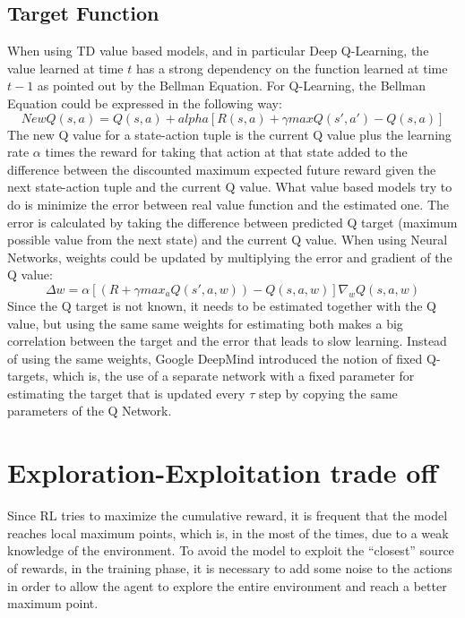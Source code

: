 \documentclass[binding=0.6cm,Lau,oneside]{sapthesis} %
\begin{document}
\subsection{Target Function}
When using TD value based models, and in particular Deep Q-Learning, the value learned at time $t$ has a strong dependency on the function learned at time $t-1$ as pointed out by the Bellman Equation. \newline
For Q-Learning, the Bellman Equation could be expressed in the following way:
\begin{equation}
NewQ( s,a ) = Q( s,a ) + alpha [ R(s,a) + \gamma maxQ(s',a') - Q(s,a) ]
\end{equation}
The new Q value for a state-action tuple is the current Q value plus the learning rate $\alpha$ times the reward for taking that action at that state added to the difference between the discounted  maximum expected future reward given the next state-action tuple and the current Q value. \newline
What value based models try to do is minimize the error between real value function and the estimated one. The error is calculated by taking the difference between predicted Q target (maximum possible value from the next state) and the current Q value. When using Neural Networks, weights could be updated by multiplying the error and gradient of the Q value:
\begin{equation}
\Delta w = \alpha [ (R + \gamma max_a Q(s',a,w)) - Q(s,a,w)] \nabla_w Q( s,a,w )
\end{equation}
Since the Q target is not known, it needs to be estimated together with the Q value, but using the same same weights for estimating both makes a big correlation between the target and the error that leads to slow learning. \newline
Instead of using the same weights, Google DeepMind introduced the notion of fixed Q-targets, which is, the use of a separate network with a fixed parameter for estimating the target that is updated every $\tau$ step by copying the same parameters of the Q Network.
\section{Exploration-Exploitation trade off}
Since RL tries to maximize the cumulative reward, it is frequent that the model reaches local maximum points, which is, in the most of the times, due to a weak knowledge of the environment.\newline
To avoid the model to exploit the “closest” source of rewards, in the training phase, it is necessary to add some noise to the actions in order to allow the agent to explore the entire environment and reach a better maximum point.
\end{document}
